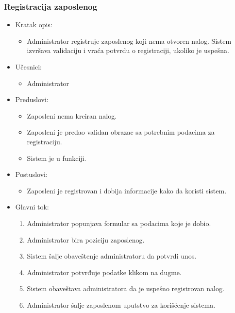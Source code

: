 \documentclass[a4paper]{article}
\begin{document}
\subsubsection{Registracija zaposlenog}

\begin{itemize}
    \item Kratak opis: 
    \begin{itemize}
        \item Administrator registruje zaposlenog koji nema otvoren nalog. Sistem izvršava validaciju i vraća potvrdu o registraciji, ukoliko je uspešna.
    \end{itemize}
    \item Učesnici:
        \begin{itemize}
        \item Administrator
    \end{itemize}
    \item Preduslovi:
        \begin{itemize}
            \item Zaposleni nema kreiran nalog.
            \item Zaposleni je predao validan obrazac sa potrebnim podacima za registraciju.
            \item Sistem je u funkciji.
        \end{itemize}
    \item Postuslovi:
        \begin{itemize}
            \item Zaposleni je registrovan i dobija informacije kako da koristi sistem.
        \end{itemize}
    \item Glavni tok:
        \begin{enumerate}
            \item Administrator popunjava formular sa podacima koje je dobio.
            \item Administrator bira poziciju zaposlenog.
            \item Sistem šalje obaveštenje administratoru da potvrdi unos.
            \item Administrator potvrđuje podatke klikom na dugme.
            \item Sistem obaveštava administratora da je uspešno registrovan nalog.
            \item Administrator šalje zaposlenom uputstvo za korišćenje sistema.
        \end{enumerate}
\end{itemize}
\end{document}
